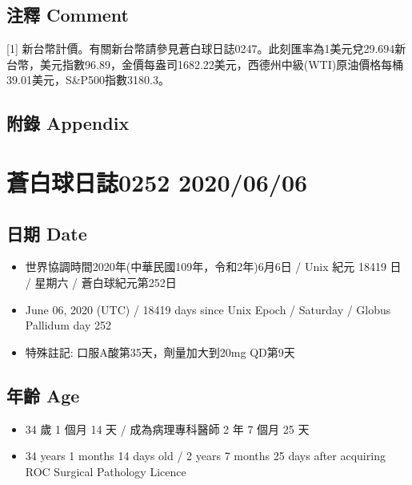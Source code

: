 \documentclass[a5paper, 11pt
]{book}
\providecommand{\tightlist}{%
  \setlength{\itemsep}{0pt}\setlength{\parskip}{0pt}}
\begin{document}
\hypertarget{ux6ce8ux91cb-comment-4}{%
\subsection{注釋 Comment}\label{ux6ce8ux91cb-comment-4}}

{[}1{]}
新台幣計價。有關新台幣請參見蒼白球日誌0247。此刻匯率為1美元兌29.694新台幣，美元指數96.89，金價每盎司1682.22美元，西德州中級(WTI)原油價格每桶39.01美元，S\&P500指數3180.3。

\hypertarget{ux9644ux9304-appendix-4}{%
\subsection{附錄 Appendix}\label{ux9644ux9304-appendix-4}}

\hypertarget{ux84bcux767dux7403ux65e5ux8a8c0252-20200606}{%
\section{蒼白球日誌0252
2020/06/06}\label{ux84bcux767dux7403ux65e5ux8a8c0252-20200606}}

\hypertarget{ux65e5ux671f-date-5}{%
\subsection{日期 Date}\label{ux65e5ux671f-date-5}}

\begin{itemize}
\tightlist
\item
  世界協調時間2020年(中華民國109年，令和2年)6月6日 / Unix 紀元 18419 日
  / 星期六 / 蒼白球紀元第252日
\item
  June 06, 2020 (UTC) / 18419 days since Unix Epoch / Saturday / Globus
  Pallidum day 252
\item
  特殊註記: 口服A酸第35天，劑量加大到20mg QD第9天
\end{itemize}

\hypertarget{ux5e74ux9f61-age-5}{%
\subsection{年齡 Age}\label{ux5e74ux9f61-age-5}}

\begin{itemize}
\tightlist
\item
  34 歲 1 個月 14 天 / 成為病理專科醫師 2 年 7 個月 25 天
\item
  34 years 1 months 14 days old / 2 years 7 months 25 days after
  acquiring ROC Surgical Pathology Licence
\end{itemize}
\end{document}
